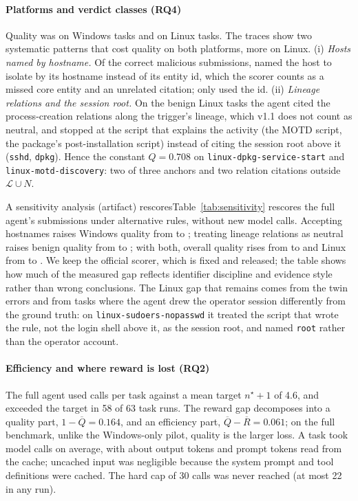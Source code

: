 \paragraph{Platforms and verdict classes (RQ4)} Quality was \ResFullWinQuality{} on Windows tasks and
\ResFullLinQuality{} on Linux tasks. The traces show two systematic patterns that cost quality on both
platforms, more on Linux. (i) \emph{Hosts named by hostname.} Of the \TrAllMalSubs{} correct malicious
submissions, \TrAllHostByName{} named the host to isolate by its hostname instead of its entity id, which
the scorer counts as a missed core entity and an unrelated citation; only \TrAllHostById{} used the id.
(ii) \emph{Lineage relations and the session root.} On the benign Linux tasks the agent cited the
process-creation relations along the trigger's lineage, which v1.1 does not count as neutral, and stopped at
the script that explains the activity (the MOTD script, the package's post-installation script) instead of
citing the session root above it (\texttt{sshd}, \texttt{dpkg}). Hence the constant $Q=0.708$ on
\texttt{linux-dpkg-service-start} and \texttt{linux-motd-discovery}: two of three anchors and two relation
citations outside $\mathcal L\cup N$.

\ifconf\else

\fi

\ifconf A sensitivity analysis (artifact) rescores\else Table~\ref{tab:sensitivity} rescores\fi{} the full agent's \TrFullSubmissions{} submissions under alternative rules,
without new model calls. Accepting hostnames raises Windows quality from \SensOfficialWindows{} to
\SensHostnamesWindows{}; treating lineage relations as neutral raises benign quality from \SensOfficialBenign{}
to \SensRelationsBenign{}; with both, overall quality rises from \SensOfficialAll{} to \SensBothAll{} and Linux
from \SensOfficialLinux{} to \SensBothLinux{}. We keep the official scorer, which is fixed and released; the
table shows how much of the measured gap reflects identifier discipline and evidence style rather than wrong
conclusions. The Linux gap that remains comes from the twin errors and from tasks where the agent drew the
operator session differently from the ground truth: on \texttt{linux-sudoers-nopasswd} it treated the script
that wrote the rule, not the login shell above it, as the session root, and named \texttt{root} rather than the
operator account.

\paragraph{Efficiency and where reward is lost (RQ2)} The full agent used \ResFullCalls{} calls per task
against a mean target $n^\star+1$ of 4.6, and exceeded the target in 58 of 63 task runs. The reward gap
decomposes into a quality part, $1-\overline{Q}=0.164$, and an efficiency part,
$\overline{Q}-\overline{R}=0.061$; on the full benchmark, unlike the Windows-only pilot, quality is the larger
loss. A task took \TrFullModelCalls{} model calls on average, with about \TrFullOutTok{} output tokens and
\TrFullCacheReadTok{} prompt tokens read from the cache; uncached input was negligible because the system
prompt and tool definitions were cached. The hard cap of 30 calls was never reached (at most 22 in any run).

